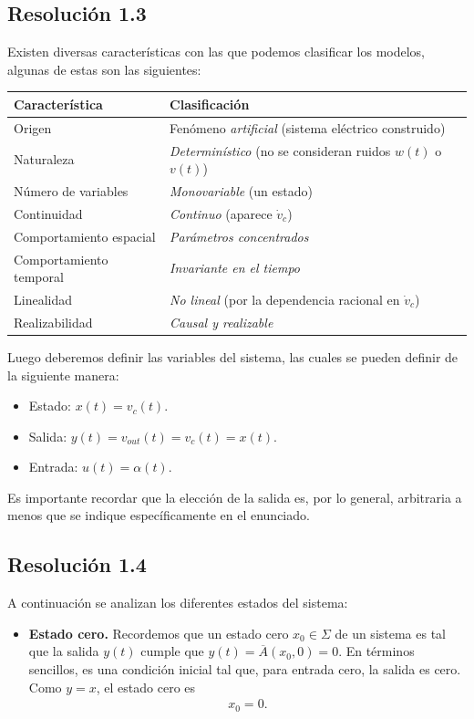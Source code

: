 \documentclass[
  11pt,
  letterpaper,
   addpoints,
   answers
  ]{exam}
\begin{document}
\begin{questions}
\begin{solution}
\subsection*{Resolución 1.3}
Existen diversas características con las que podemos clasificar los modelos, algunas de estas son las siguientes:
\begin{center}
\begin{tabular}{|l|l|}
\hline
\textbf{Característica} & \textbf{Clasificación} \\
\hline
Origen & Fenómeno \emph{artificial} (sistema eléctrico construido) \\
\hline
Naturaleza & \emph{Determinístico} (no se consideran ruidos \(w(t)\) o \(v(t)\)) \\
\hline
Número de variables & \emph{Monovariable} (un estado) \\
\hline
Continuidad & \emph{Continuo} (aparece \(\dot v_c\)) \\
\hline
Comportamiento espacial & \emph{Parámetros concentrados} \\
\hline
Comportamiento temporal & \emph{Invariante en el tiempo} \\
\hline
Linealidad & \emph{No lineal} (por la dependencia racional en \(\dot v_c\)) \\
\hline
Realizabilidad & \emph{Causal y realizable} \\
\hline
\end{tabular}
\end{center}
Luego deberemos definir las variables del sistema, las cuales se pueden definir de la siguiente manera:
\begin{itemize}
    \item Estado: \(x(t)=v_c(t)\).
    \item Salida: \(y(t)=v_{out}(t)=v_c(t)=x(t)\).
    \item Entrada: \(u(t)=\alpha(t)\).
\end{itemize}
Es importante recordar que la elección de la salida es, por lo general, arbitraria a menos que se indique específicamente en el enunciado.
\subsection*{Resolución 1.4}
A continuación se analizan los diferentes estados del sistema:

\begin{itemize}
    \item \textbf{Estado cero.} Recordemos que un estado cero \(x_0 \in \Sigma\) de un sistema es tal que la salida \(y(t)\) cumple que \(y(t) = \overline{A}(x_0, 0) = 0\). En términos sencillos, es una condición inicial tal que, para entrada cero, la salida es cero. Como \(y=x\), el estado cero es
    \begin{align}
    x_0 = 0.
    \end{align}
    

\end{itemize}
\end{solution}
\end{questions}
\end{document}
